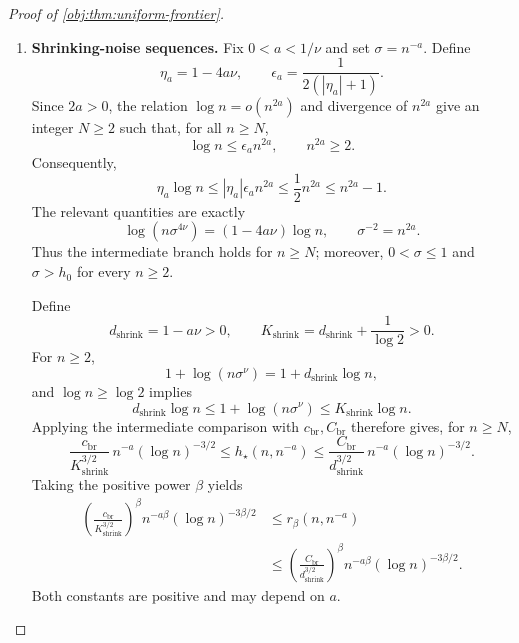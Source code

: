 \begin{proof}[Proof of \cref{obj:thm:uniform-frontier}]
\begin{enumerate}
At the direct--noisy equality \(\sigma=h_0\), the direct result gives
\[
h_\star(n,\sigma)=\sigma=h_0,\qquad
\log(n\sigma^\nu)=0.
\]
The intermediate scalar equation then holds at \(z=1\), and
\(\sigma z^{-3/2}=\sigma\).

Finally, \(c_{\mathrm{br}}\le1,c_\tau,c_{\mathrm{pow}}\) and
\(C_{\mathrm{br}}\ge A_{\mathrm{int}},C_\tau,C_{\mathrm{pow}}\).
All comparison factors above are positive. Replacing their lower constants
by \(c_{\mathrm{br}}\) and their upper constants by \(C_{\mathrm{br}}\)
therefore gives simultaneous branch comparisons, with the exact equations
and interfaces unchanged.

\item \textbf{Shrinking-noise sequences.}
Fix \(0<a<1/\nu\) and set \(\sigma=n^{-a}\). Define
\[
\eta_a=1-4a\nu,\qquad
\epsilon_a=\frac1{2(|\eta_a|+1)}.
\]
Since \(2a>0\), the relation \(\log n=o(n^{2a})\) and divergence of \(n^{2a}\)
give an integer \(N\ge2\) such that, for all \(n\ge N\),
\[
\log n\le\epsilon_a n^{2a},
\qquad n^{2a}\ge2.
\]
Consequently,
\[
\eta_a\log n
\le|\eta_a|\epsilon_a n^{2a}
\le\frac12n^{2a}
\le n^{2a}-1.
\]
The relevant quantities are exactly
\[
\log(n\sigma^{4\nu})=(1-4a\nu)\log n,
\qquad
\sigma^{-2}=n^{2a}.
\]
Thus the intermediate branch holds for \(n\ge N\); moreover,
\(0<\sigma\le1\) and \(\sigma>h_0\) for every \(n\ge2\).

Define
\[
d_{\mathrm{shrink}}=1-a\nu>0,\qquad
K_{\mathrm{shrink}}=d_{\mathrm{shrink}}+\frac1{\log2}>0.
\]
For \(n\ge2\),
\[
1+\log(n\sigma^\nu)=1+d_{\mathrm{shrink}}\log n,
\]
and \(\log n\ge\log2\) implies
\[
d_{\mathrm{shrink}}\log n
\le1+\log(n\sigma^\nu)
\le K_{\mathrm{shrink}}\log n.
\]
Applying the intermediate comparison with \(c_{\mathrm{br}},C_{\mathrm{br}}\)
therefore gives, for \(n\ge N\),
\[
\frac{c_{\mathrm{br}}}{K_{\mathrm{shrink}}^{3/2}}
\,n^{-a}(\log n)^{-3/2}
\le h_\star(n,n^{-a})
\le
\frac{C_{\mathrm{br}}}{d_{\mathrm{shrink}}^{3/2}}
\,n^{-a}(\log n)^{-3/2}.
\]
Taking the positive power \(\beta\) yields
\[
\begin{aligned}
\left(\frac{c_{\mathrm{br}}}{K_{\mathrm{shrink}}^{3/2}}\right)^\beta
n^{-a\beta}(\log n)^{-3\beta/2}
&\le r_\beta(n,n^{-a})\\
&\le
\left(\frac{C_{\mathrm{br}}}{d_{\mathrm{shrink}}^{3/2}}\right)^\beta
n^{-a\beta}(\log n)^{-3\beta/2}.
\end{aligned}
\]
Both constants are positive and may depend on \(a\).


\end{enumerate}
\end{proof}
